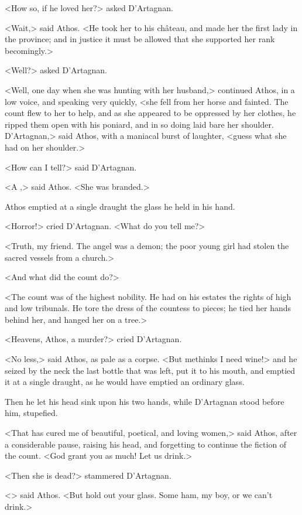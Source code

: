 <How so, if he loved her?> asked D'Artagnan. 

<Wait,> said Athos. <He took her to his château, and made her the first lady in the province; and in justice it must be allowed that she supported her rank becomingly.> 

<Well?> asked D'Artagnan. 

<Well, one day when she was hunting with her husband,> continued Athos, in a low voice, and speaking very quickly, <she fell from her horse and fainted. The count flew to her to help, and as she appeared to be oppressed by her clothes, he ripped them open with his poniard, and in so doing laid bare her shoulder. D'Artagnan,> said Athos, with a maniacal burst of laughter, <guess what she had on her shoulder.> 

<How can I tell?> said D'Artagnan. 

<A ,> said Athos. <She was branded.> 

Athos emptied at a single draught the glass he held in his hand. 

<Horror!> cried D'Artagnan. <What do you tell me?> 

<Truth, my friend. The angel was a demon; the poor young girl had stolen the sacred vessels from a church.> 

<And what did the count do?> 

<The count was of the highest nobility. He had on his estates the rights of high and low tribunals. He tore the dress of the countess to pieces; he tied her hands behind her, and hanged her on a tree.> 

<Heavens, Athos, a murder?> cried D'Artagnan. 

<No less,> said Athos, as pale as a corpse. <But methinks I need wine!> and he seized by the neck the last bottle that was left, put it to his mouth, and emptied it at a single draught, as he would have emptied an ordinary glass. 

Then he let his head sink upon his two hands, while D'Artagnan stood before him, stupefied. 

<That has cured me of beautiful, poetical, and loving women,> said Athos, after a considerable pause, raising his head, and forgetting to continue the fiction of the count. <God grant you as much! Let us drink.> 

<Then she is dead?> stammered D'Artagnan. 

<> said Athos. <But hold out your glass. Some ham, my boy, or we can't drink.> 

